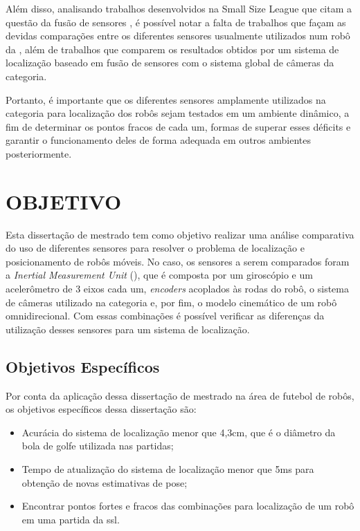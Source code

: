 \documentclass[acronym, symbols, table, deposito]{fei}
\begin{document}
	Além disso, analisando trabalhos desenvolvidos na Small Size League que citam a questão da fusão de sensores \cite{Ryll2013TIGERSM, ubc_thunderbots_2017, parsian_2015, parsian_2019, mrl_2020, ubc_thunderbots_2015, immortals_2023}, é possível notar a falta de trabalhos que façam as devidas comparações entre os diferentes sensores usualmente utilizados num robô da , além de trabalhos que comparem os resultados obtidos por um sistema de localização baseado em fusão de sensores com o sistema global de câmeras da categoria.
	
	Portanto, é importante que os diferentes sensores amplamente utilizados na categoria  para localização dos robôs sejam testados em um ambiente dinâmico, a fim de determinar os pontos fracos de cada um, formas de superar esses déficits e garantir o funcionamento deles de forma adequada em outros ambientes posteriormente.
	
	\section{OBJETIVO}
	
		Esta dissertação de mestrado tem como objetivo realizar uma análise comparativa do uso de diferentes sensores para resolver o problema de localização e posicionamento de robôs móveis. No caso, os sensores a serem comparados foram a \textit{Inertial Measurement Unit} (), que é composta por um giroscópio e um acelerômetro de 3 eixos cada um, \textit{encoders} acoplados às rodas do robô, o sistema de câmeras utilizado na categoria  e, por fim, o modelo cinemático de um robô omnidirecional. Com essas combinações é possível verificar as diferenças da utilização desses sensores para um sistema de localização.
		
		\subsection{Objetivos Específicos}
		
			Por conta da aplicação dessa dissertação de mestrado na área de futebol de robôs, os objetivos específicos dessa dissertação são:
			
			\begin{itemize}
				\item Acurácia do sistema de localização menor que 4,3cm, que é o diâmetro da bola de golfe utilizada nas partidas;
				\item Tempo de atualização do sistema de localização menor que 5ms para obtenção de novas estimativas de pose;
				\item Encontrar pontos fortes e fracos das combinações para localização de um robô em uma partida da \acrlong{ssl}.
			\end{itemize}
		
\end{document}
